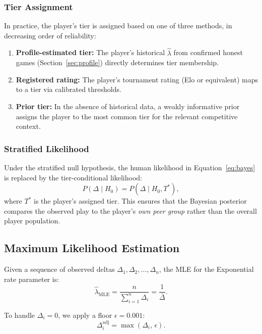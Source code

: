 \documentclass[11pt,a4paper]{article}
\begin{document}
\subsubsection{Tier Assignment}

In practice, the player's tier is assigned based on one of three methods,
in decreasing order of reliability:
\begin{enumerate}
    \item \textbf{Profile-estimated tier:} The player's historical
          $\hat{\lambda}$ from confirmed honest games (Section~\ref{sec:profile})
          directly determines tier membership.
    \item \textbf{Registered rating:} The player's tournament rating (Elo or
          equivalent) maps to a tier via calibrated thresholds.
    \item \textbf{Prior tier:} In the absence of historical data, a weakly
          informative prior assigns the player to the most common tier for
          the relevant competitive context.
\end{enumerate}

\subsubsection{Stratified Likelihood}

Under the stratified null hypothesis, the human likelihood in
Equation~\eqref{eq:bayes} is replaced by the tier-conditional likelihood:
\begin{equation}
    P(\Delta \mid H_0) = P(\Delta \mid H_0, T^*),
    \label{eq:stratified_h0}
\end{equation}
where $T^*$ is the player's assigned tier. This ensures that the
Bayesian posterior compares the observed play to the player's
\emph{own peer group} rather than the overall player population.

\subsection{Maximum Likelihood Estimation}

Given a sequence of observed deltas $\Delta_1, \Delta_2, \ldots, \Delta_n$,
the MLE for the Exponential rate parameter is:
\begin{equation}
    \hat{\lambda}_{\text{MLE}} = \frac{n}{\sum_{i=1}^{n} \Delta_i}
    = \frac{1}{\bar{\Delta}}.
    \label{eq:lambda_mle}
\end{equation}

To handle $\Delta_i = 0$, we apply a floor $\epsilon = 0.001$:
\begin{equation}
    \Delta_i^{\text{adj}} = \max(\Delta_i, \, \epsilon).
    \label{eq:delta_adj}
\end{equation}
\end{document}

